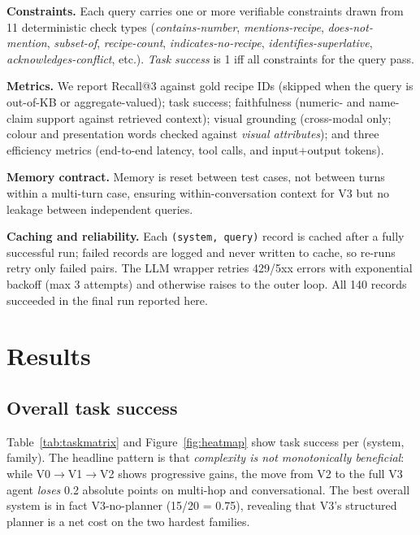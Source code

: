 \documentclass[sigconf, nonacm=true, anonymous=false]{acmart}
\begin{document}
\textbf{Constraints.} Each query carries one or more verifiable
constraints drawn from 11 deterministic check types
(\textit{contains-number}, \textit{mentions-recipe}, \textit{does-not-mention},
\textit{subset-of}, \textit{recipe-count}, \textit{indicates-no-recipe},
\textit{identifies-superlative}, \textit{acknowledges-conflict}, etc.).
\emph{Task success} is 1 iff all constraints for the query pass.

\textbf{Metrics.} We report Recall@3 against gold recipe IDs (skipped
when the query is out-of-KB or aggregate-valued); task success;
faithfulness (numeric- and name-claim support against retrieved
context); visual grounding (cross-modal only; colour and presentation
words checked against \emph{visual attributes}); and three efficiency
metrics (end-to-end latency, tool calls, and input+output tokens).

\textbf{Memory contract.} Memory is reset between test cases, not
between turns within a multi-turn case, ensuring within-conversation
context for V3 but no leakage between independent queries.

\textbf{Caching and reliability.} Each \texttt{(system, query)} record is
cached after a fully successful run; failed records are logged and never
written to cache, so re-runs retry only failed pairs. The LLM wrapper
retries 429/5xx errors with exponential backoff (max 3 attempts) and
otherwise raises to the outer loop. All 140 records succeeded in the
final run reported here.

\section{Results}
\label{sec:results}

\FloatBarrier
\subsection{Overall task success}

Table~\ref{tab:taskmatrix} and Figure~\ref{fig:heatmap} show task
success per (system, family). The headline pattern is that
\emph{complexity is not monotonically beneficial}: while V0$\to$V1$\to$V2
shows progressive gains, the move from V2 to the full V3 agent
\emph{loses} 0.2 absolute points on multi-hop and conversational. The
best overall system is in fact V3-no-planner (15/20 = 0.75), revealing
that V3's structured planner is a net cost on the two hardest families.
\end{document}
